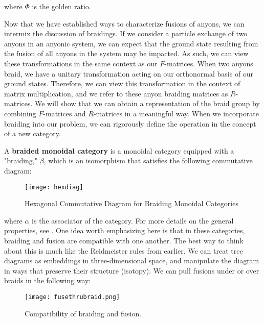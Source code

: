 where $\Phi$ is the golden ratio.

Now that we have established ways to characterize fusions of anyons, we can intermix the discussion of braidings. If we consider a particle exchange of two anyons in an anyonic system, we can expect that the ground state resulting from the fusion of all anyons in the system may be impacted. As such, we can view these transformations in the same context as our $F$-matrices. When two anyons braid, we have a unitary transformation acting on our orthonormal basis of our ground states. Therefore, we can view this transformation in the context of matrix multiplication, and we refer to these anyon braiding matrices as $R$-matrices. We will show that we can obtain a representation of the braid group by combining $F$-matrices and $R$-matrices in a meaningful way. When we incorporate braiding into our problem, we can rigorously define the operation in the concept of a new category.


\begin{definition}
	A \textbf{braided monoidal category} is a monoidal category equipped with a "braiding," $\beta$, which is an isomorphism that satisfies the following commutative diagram:
\end{definition}

\begin{figure}[H]
	\centering
	\texttt{[image: hexdiag]}
	\caption{Hexagonal Commutative Diagram for Braiding Monoidal Categories}
\end{figure}

where $\alpha$ is the associator of the category. For more details on the general properties, see \cite{Joyal}. One idea worth emphasizing here is that in these categories, braiding and fusion are compatible with one another. The best way to think about this is much like the Reidmeister rules from earlier. We can treat tree diagrams as embeddings in three-dimensional space, and manipulate the diagram in ways that preserve their structure (isotopy). We can pull fusions under or over braids in the following way:

\begin{figure}[H]
	\centering
	\texttt{[image: fusethrubraid.png]}
	\caption{Compatibility of braiding and fusion.}
\end{figure}


